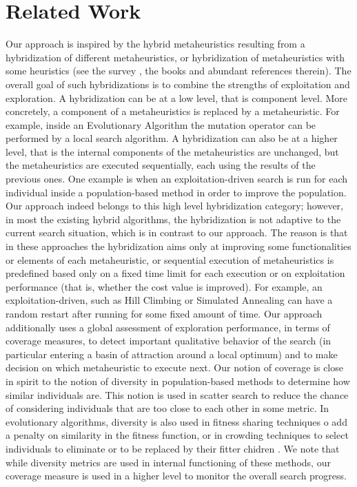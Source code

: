 \section{Related Work}
Our approach is inspired by the hybrid metaheuristics resulting from a hybridization of different metaheuristics, or hybridization of metaheuristics with some heuristics (see the survey \cite{Talbi2009}, the books \cite{Lones2011,Talbi2013} and abundant references therein). The overall goal of such hybridizations is to combine the strengths of exploitation and exploration. A hybridization can be at a low level, that is component level. More concretely, a component of a metaheuristics is replaced by a metaheuristic. For example, inside an Evolutionary Algorithm the mutation operator can be performed by a local search algorithm. A hybridization can also be at a higher level, that is the internal components of the metaheuristics are unchanged, but the metaheuristics are executed sequentially, each using the results of the previous ones. One example is when an exploitation-driven search is run for each individual inside a population-based method in order to improve the population. Our approach indeed belongs to this high level hybridization category; however, in most the existing hybrid algorithms, the hybridization is not adaptive to the current search situation, which is in contrast to our approach. The reason is that in these approaches the hybridization aims only at improving some functionalities or elements of each metaheuristic, or sequential execution of metaheuristics is predefined based only on a fixed time limit for each execution or on exploitation performance (that is, whether the cost value is improved). For example, an exploitation-driven, such as Hill Climbing or Simulated Annealing can have a random restart after running for some fixed amount of time. Our approach additionally uses a global assessment of exploration performance, in terms of coverage measures, to detect important qualitative behavior of the search (in particular entering a basin of attraction around a local optimum) and to make decision on which metaheuristic to execute next. Our notion of coverage is close in spirit to the notion of diversity in population-based methods to determine how similar individuals are. This notion is used in scatter search \cite{Glover2011} to reduce the chance of considering individuals that are too close to each other in some metric. In evolutionary algorithms, diversity is also used in fitness sharing techniques o add a penalty on similarity in the fitness function, or in crowding techniques to select individuals to eliminate or to be replaced by their fitter chidren \cite{WongWMPZ2012}. We note that while diversity metrics are used in internal functioning of these methods, our coverage measure is used in a higher level to monitor the overall search progress.
